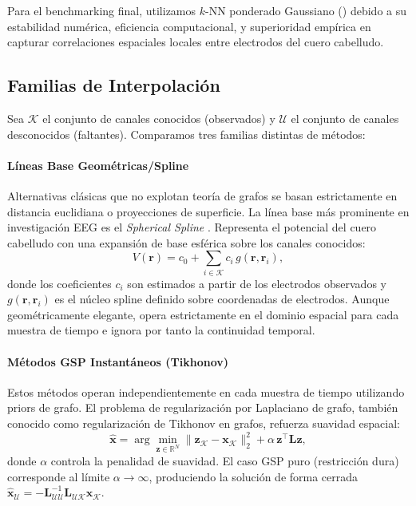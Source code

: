 Para el benchmarking final, utilizamos $k$-NN ponderado Gaussiano () debido a su estabilidad numérica, eficiencia computacional, y superioridad empírica en capturar correlaciones espaciales locales entre electrodos del cuero cabelludo.

\subsection{Familias de Interpolación}

Sea $\mathcal{K}$ el conjunto de canales conocidos (observados) y $\mathcal{U}$ el conjunto de canales desconocidos (faltantes). Comparamos tres familias distintas de métodos:

\paragraph{Líneas Base Geométricas/Spline} 
Alternativas clásicas que no explotan teoría de grafos se basan estrictamente en distancia euclidiana o proyecciones de superficie. La línea base más prominente en investigación EEG es el \emph{Spherical Spline} \cite{perrin1989}. Representa el potencial del cuero cabelludo con una expansión de base esférica sobre los canales conocidos:
\begin{equation}
V(\mathbf{r}) = c_0 + \sum_{i \in \mathcal{K}} c_i \, g(\mathbf{r}, \mathbf{r}_i),
\end{equation}
donde los coeficientes $c_i$ son estimados a partir de los electrodos observados y $g(\mathbf{r}, \mathbf{r}_i)$ es el núcleo spline definido sobre coordenadas de electrodos. Aunque geométricamente elegante, opera estrictamente en el dominio espacial para cada muestra de tiempo e ignora por tanto la continuidad temporal.

\paragraph{Métodos GSP Instantáneos (Tikhonov)} 
Estos métodos operan independientemente en cada muestra de tiempo utilizando priors de grafo. El problema de regularización por Laplaciano de grafo, también conocido como regularización de Tikhonov en grafos, refuerza suavidad espacial:
\begin{equation}
  \hat{\mathbf{x}} = \arg\min_{\mathbf{z} \in \mathbb{R}^N}
    \|\mathbf{z}_{\mathcal{K}} - \mathbf{x}_{\mathcal{K}}\|_2^2 + \alpha \, \mathbf{z}^\top \mathbf{L} \mathbf{z},
  \label{eq:tikhonov}
\end{equation}
donde $\alpha$ controla la penalidad de suavidad. El caso GSP puro (restricción dura) corresponde al límite $\alpha \to \infty$, produciendo la solución de forma cerrada $\hat{\mathbf{x}}_{\mathcal{U}} = -\mathbf{L}_{\mathcal{U}\mathcal{U}}^{-1} \mathbf{L}_{\mathcal{U}\mathcal{K}} \mathbf{x}_{\mathcal{K}}$.

